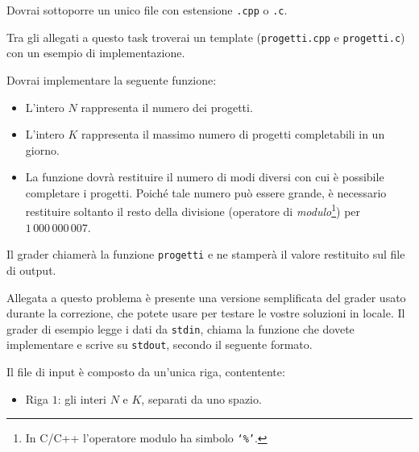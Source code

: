 \Implementation
Dovrai sottoporre un unico file con estensione \texttt{.cpp} o \texttt{.c}.

\begin{warning}
Tra gli allegati a questo task troverai un template (\texttt{progetti.cpp} e \texttt{progetti.c}) con un esempio di implementazione.
\end{warning}

\pagebreak

Dovrai implementare la seguente funzione:

\begin{itemize}[nolistsep]

    \begin{itemize}[nolistsep]
        \item L'intero $N$ rappresenta il numero dei progetti.
        \item L'intero $K$ rappresenta il massimo numero di progetti completabili in un giorno.
        \item La funzione dovrà restituire il numero di modi diversi con cui è possibile completare i progetti. Poiché tale numero può essere grande, è necessario restituire soltanto il resto della divisione (operatore di \emph{modulo}\footnote{In C/C++ l'operatore modulo ha simbolo \texttt{`\%'}.}) per $1\,000\,000\,007$.

    \end{itemize}
\end{itemize}

Il grader chiamerà la funzione \texttt{progetti} e ne stamperà il valore restituito sul file di output.



\Grader
Allegata a questo problema è presente una versione semplificata del grader usato durante la correzione, che potete usare per testare le vostre soluzioni in locale. Il grader di esempio legge i dati da \texttt{stdin}, chiama la funzione che dovete implementare e scrive su \texttt{stdout}, secondo il seguente formato.

Il file di input è composto da un'unica riga, contentente:

\begin{itemize}[nolistsep,itemsep=2mm]
    \item Riga $1$: gli interi $N$ e $K$, separati da uno spazio.
\end{itemize}

